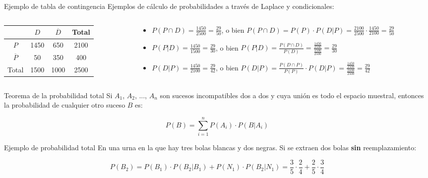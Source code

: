 \documentclass[11pt]{beamer}
\begin{document}
\begin{frame}{Ejemplo de tabla de contingencia}
Ejemplos de cálculo de probabilidades a través de Laplace y condicionales:
\begin{columns}
\begin{column}{0.41\textwidth}
     \begin{tabular}{|c | c | c | c |} 
     \hline
      &  $D$ & $\overline{D}$ & Total \\ [0.5ex] 
     \hline
     $P$ & \color{red}1450 & \color{red}650 & 2100 \\ 
     \hline
     $\overline{P}$ & \color{red}50  & 350 & \color{red}400 \\
     \hline
     Total & 1500 & \color{red}1000 &  2500 \\
     \hline
    \end{tabular}
\end{column}
\begin{column}{0.65\textwidth}  
\begin{itemize}[<+->]
    \item $P(P \cap D)= \frac{1450}{2500}=\frac{29}{50}$, o bien $P(P \cap D)= P(P)\cdot P(D|P)=\frac{2100}{2500}\cdot \frac{1450}{2100}=\frac{29}{50}$
    \item $P(P|D)=\frac{1450}{1500}=\frac{29}{30}$, o bien $P(P|D)=\frac{P(P \cap D)}{P(D)} =\frac{\frac{1450}{2500}}{\frac{1500}{2500}}=\frac{29}{30}$
    \item $P(D|P)=\frac{1450}{2100}=\frac{29}{42}$, o bien $P(D|P)= \frac{P(D \cap P)}{P(P)} \cdot P(D|P)=\frac{\frac{1450}{2500}}{\frac{2100}{2500}}=\frac{29}{42}$
\end{itemize}
\end{column}
\end{columns}
\end{frame}

\begin{frame}{Teorema de la probabilidad total}
Si $A_1$, $A_2$, ..., $A_n$   son sucesos incompatibles dos a dos y cuya unión es todo el espacio muestral, entonces la probabilidad de cualquier otro suceso $B$ es:
\begin{block}{}
$$P(B)=\sum_{i=1}^n P(A_i)\cdot  P(B|A_i) $$
\end{block}

\end{frame}

\begin{frame}{Ejemplo de probabilidad total}
En una urna en la que hay tres bolas blancas y dos negras. Si se extraen dos bolas \textbf{sin} reemplazamiento:

\pause
$$P(B_2)=P(B_1)\cdot P(B_2|B_1) + P(N_1)\cdot P(B_2|N_1)
= \frac{3}{5}\cdot\frac{2}{4} + \frac{2}{5}\cdot\frac{3}{4}$$
\end{frame}
\end{document}
